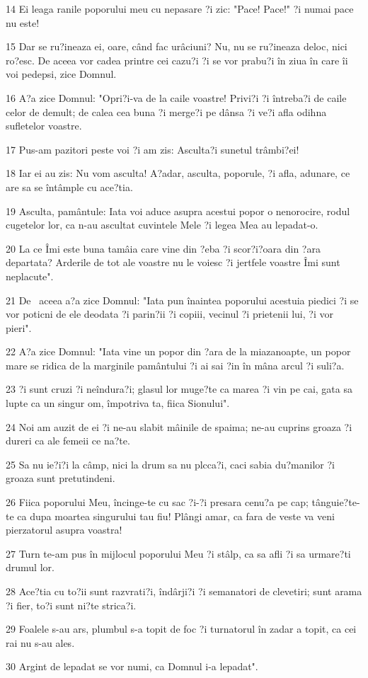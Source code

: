 \par 14 Ei leaga ranile poporului meu cu nepasare ?i zic: "Pace! Pace!" ?i numai pace nu este!
\par 15 Dar se ru?ineaza ei, oare, când fac urâciuni? Nu, nu se ru?ineaza deloc, nici ro?esc. De aceea vor cadea printre cei cazu?i ?i se vor prabu?i în ziua în care îi voi pedepsi, zice Domnul.
\par 16 A?a zice Domnul: "Opri?i-va de la caile voastre! Privi?i ?i întreba?i de caile celor de demult; de calea cea buna ?i merge?i pe dânsa ?i ve?i afla odihna sufletelor voastre.
\par 17 Pus-am pazitori peste voi ?i am zis: Asculta?i sunetul trâmbi?ei!
\par 18 Iar ei au zis: Nu vom asculta! A?adar, asculta, poporule, ?i afla, adunare, ce are sa se întâmple cu ace?tia.
\par 19 Asculta, pamântule: Iata voi aduce asupra acestui popor o nenorocire, rodul cugetelor lor, ca n-au ascultat cuvintele Mele ?i legea Mea au lepadat-o.
\par 20 La ce Îmi este buna tamâia care vine din ?eba ?i scor?i?oara din ?ara departata? Arderile de tot ale voastre nu le voiesc ?i jertfele voastre Îmi sunt neplacute".
\par 21 De  aceea a?a zice Domnul: "Iata pun înaintea poporului acestuia piedici ?i se vor poticni de ele deodata ?i parin?ii ?i copiii, vecinul ?i prietenii lui, ?i vor pieri".
\par 22 A?a zice Domnul: "Iata vine un popor din ?ara de la miazanoapte, un popor mare se ridica de la marginile pamântului ?i ai sai ?in în mâna arcul ?i suli?a.
\par 23 ?i sunt cruzi ?i neîndura?i; glasul lor muge?te ca marea ?i vin pe cai, gata sa lupte ca un singur om, împotriva ta, fiica Sionului".
\par 24 Noi am auzit de ei ?i ne-au slabit mâinile de spaima; ne-au cuprins groaza ?i dureri ca ale femeii ce na?te.
\par 25 Sa nu ie?i?i la câmp, nici la drum sa nu plcca?i, caci sabia du?manilor ?i groaza sunt pretutindeni.
\par 26 Fiica poporului Meu, încinge-te cu sac ?i-?i presara cenu?a pe cap; tânguie?te-te ca dupa moartea singurului tau fiu! Plângi amar, ca fara de veste va veni pierzatorul asupra voastra!
\par 27 Turn te-am pus în mijlocul poporului Meu ?i stâlp, ca sa afli ?i sa urmare?ti drumul lor.
\par 28 Ace?tia cu to?ii sunt razvrati?i, îndârji?i ?i semanatori de clevetiri; sunt arama ?i fier, to?i sunt ni?te strica?i.
\par 29 Foalele s-au ars, plumbul s-a topit de foc ?i turnatorul în zadar a topit, ca cei rai nu s-au ales.
\par 30 Argint de lepadat se vor numi, ca Domnul i-a lepadat".

